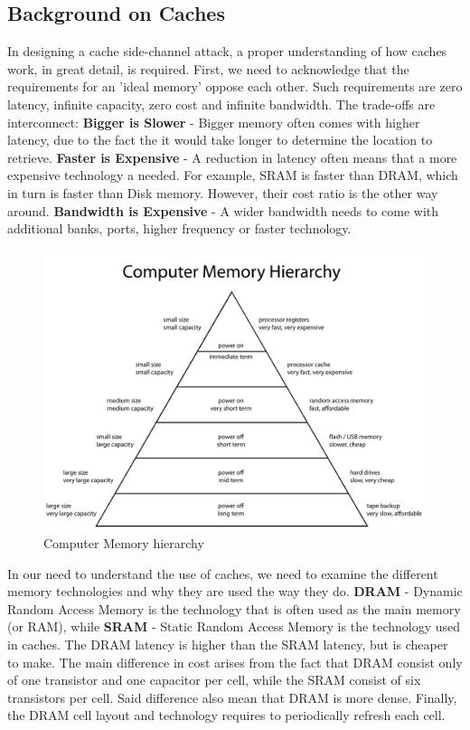 \subsection{Background on Caches}
\label{subsec:backgroundoncaches}
In designing a cache side-channel attack, a proper understanding of how caches
work, in great detail, is required. First, we need to acknowledge that the
requirements for an 'ideal memory' oppose each other. Such requirements are zero
latency, infinite capacity, zero cost and infinite bandwidth. The trade-offs are
interconnect: \textbf{Bigger is Slower} - Bigger memory often comes with higher
latency, due to the fact the it would take longer to determine the location to
retrieve.  \textbf{Faster is Expensive} - A reduction in latency often means
that a more expensive technology a needed. For example, SRAM is faster than
DRAM, which in turn is faster than Disk memory. However, their cost ratio is the
other way around. \textbf{Bandwidth is Expensive} - A wider bandwidth needs to
come with additional banks, ports, higher frequency or faster technology. 

\begin{figure}
    \includegraphics[width=\textwidth]{images/chapter_6/Computer_memory_Hierarchy.png}
    \caption{Computer Memory hierarchy\cite{wikiComputerMemoryHierarchy}}
    \label{fig:CMH}
\end{figure}

In our need to understand the use of caches, we need to examine the different
memory technologies and why they are used the way they do. \textbf{DRAM} -
Dynamic Random Access Memory is the technology that is often used as the main
memory (or RAM), while \textbf{SRAM} - Static Random Access Memory is the
technology used in caches. The DRAM latency is higher than the SRAM latency, but
is cheaper to make. The main difference in cost arises from the fact that DRAM
consist only of one transistor and one capacitor per cell, while the SRAM
consist of six transistors per cell. Said difference also mean that DRAM is more
dense. Finally, the DRAM cell layout and technology requires to periodically
refresh each cell.

